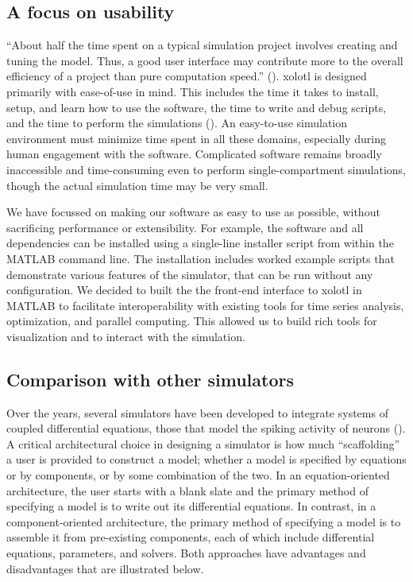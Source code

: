 \documentclass{frontiersSCNS} %
\begin{document}
\subsection{A focus on usability}

``About half the time spent on a typical simulation project involves creating and tuning the model. Thus, a good user interface may contribute more to the overall efficiency of a project than pure computation speed.'' (\cite{deschutterConsumerGuideNeuronal1992}). xolotl is designed primarily with ease-of-use in mind. This includes the time it takes to install, setup, and learn how to use the software, the time to write and debug scripts, and the time to perform the simulations (\cite{rudolph2007much}). An easy-to-use simulation environment must minimize time spent in all these domains, especially during human engagement with the software. Complicated software remains broadly inaccessible and time-consuming even to perform single-compartment simulations, though the actual simulation time may be very small. 

We have focussed on making our software as easy to use as possible, without sacrificing performance or extensibility. For example, the software and all dependencies can be installed using a single-line installer script from within the MATLAB command line. The installation includes worked example scripts that demonstrate various features of the simulator, that can be run without any configuration.  We decided to built the the front-end interface to xolotl in MATLAB to facilitate interoperability with existing tools for time series analysis, optimization, and parallel computing. This allowed us to build rich tools for visualization and to interact with the simulation. 

\subsection{Comparison with other simulators}

Over the years, several simulators have been developed to integrate systems of coupled differential equations, those that model the spiking activity of neurons (\cite{bretteSimulationNetworksSpiking2007, sherfeyDynaSimMATLABToolbox2018, vitayANNarchyCodeGeneration2015, delormeSpikeNETEventdrivenSimulation2003, hinesNEURONSimulationEnvironment1997}). A critical architectural choice in designing a simulator is how much ``scaffolding'' a user is provided to construct a model; whether a model is specified by equations or by components, or by some combination of the two. In an equation-oriented architecture, the user starts with a blank slate and the primary method of specifying a model is to write out its differential equations. In contrast, in a component-oriented architecture, the primary method of specifying a model is to assemble it from pre-existing components, each of which include differential equations, parameters, and solvers. Both approaches have advantages and disadvantages that are illustrated below. 
\end{document}
